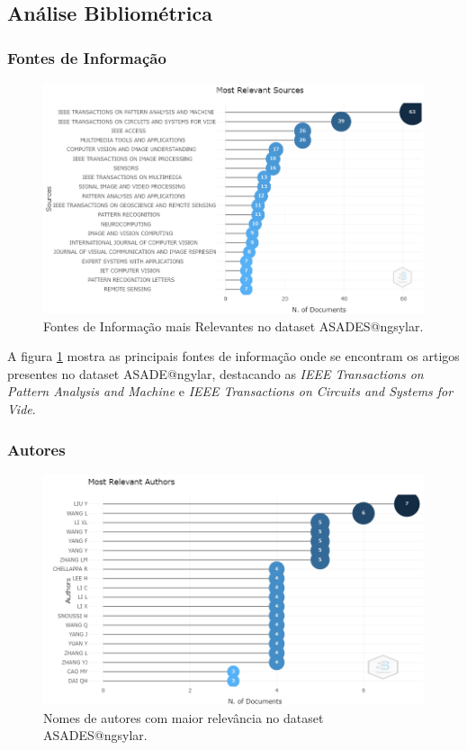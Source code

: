 \subsection{Análise Bibliométrica}

\subsubsection{Fontes de Informação}

\begin{figure}[H]
    \centering
    \includegraphics[angle=0,width=1\textwidth]{experiments/ngsylar/PesqBibliogr/Imagens/ASADES-MostRelevantSources.png}
    \caption{Fontes de Informação mais Relevantes no dataset ASADES@ngsylar.}
    \label{fig:ASADES@ngsylar:RelevantSources}
\end{figure}

A figura \ref{fig:ASADES@ngsylar:RelevantSources} mostra as principais fontes de informação onde se encontram os artigos presentes no dataset ASADE@ngylar, destacando as \textit{IEEE Transactions on Pattern Analysis and Machine} e \textit{IEEE Transactions on Circuits and Systems for Vide}.

\subsubsection{Autores}

\begin{figure}[H]
    \centering
    \includegraphics[angle=0,width=1\textwidth]{experiments/ngsylar/PesqBibliogr/Imagens/ASADES-MostRelevantAuthors.png}
    \caption{Nomes de autores com maior relevância no dataset ASADES@ngsylar.}
    \label{fig:ASADES@ngsylar:RelevantAuthors}
\end{figure}

